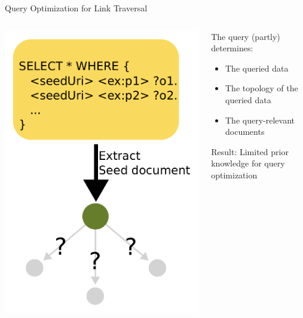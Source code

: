 
\begin{frame}{Query Optimization for Link Traversal}
    \begin{columns}[T] %
        \begin{column}{0.6\textwidth} %
            \includegraphics[width=.60\linewidth]{images/hardToOptimizeLTQP.pdf} %
        \end{column}

        \begin{column}{0.4\textwidth}
            The query (partly) determines:
            \begin{itemize}
                \item The queried data
                \item The topology of the queried data
                \item The query-relevant documents
            \end{itemize}
            Result: Limited prior knowledge for query optimization
        \end{column}
    \end{columns}
\end{frame}

